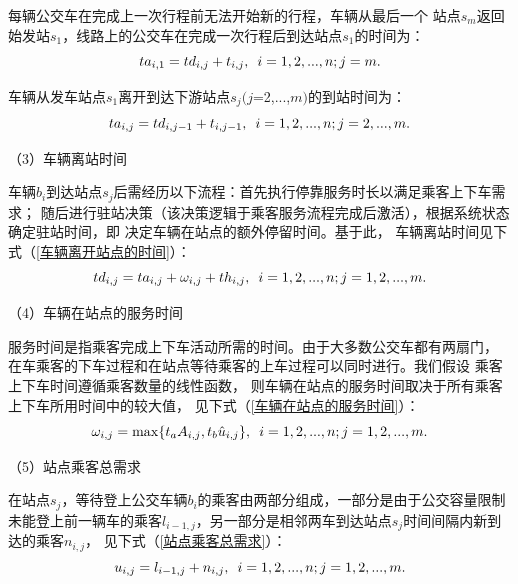 每辆公交车在完成上一次行程前无法开始新的行程，车辆从最后一个
站点$s_{m}$返回始发站$s_{1}$，线路上的公交车在完成一次行程后到达站点$s_{1}$的时间为：
\begin{equation}\label{发车时间间隔}
    ta_{i,1} = td_{i,j} + t_{i,j},\hspace{0.5em} i = 1,2,...,n; j = m.
\end{equation}

车辆从发车站点$s_{1}$离开到达下游站点$s_{j}(j$=2,...,$m)$的到站时间为：
\begin{equation}\label{车辆到达站点的时间}
    ta_{i,j} = td_{i,j-1} + t_{i,j-1},\hspace{0.5em} i = 1,2,...,n; j = 2,...,m.
\end{equation}

（3）车辆离站时间

车辆$b_{i}$到达站点$s_{j}$后需经历以下流程：首先执行停靠服务时长以满足乘客上下车需求；
随后进行驻站决策（该决策逻辑于乘客服务流程完成后激活），根据系统状态确定驻站时间，即
决定车辆在站点的额外停留时间。基于此，
车辆离站时间见下式（\ref{车辆离开站点的时间}）：
\begin{equation}\label{车辆离开站点的时间}
    td_{i,j} = ta_{i,j} + \omega_{i,j} + th_{i,j},\hspace{0.5em} i = 1,2,...,n; j = 1,2,...,m.
\end{equation}

（4）车辆在站点的服务时间

服务时间是指乘客完成上下车活动所需的时间。由于大多数公交车都有两扇门，
在车乘客的下车过程和在站点等待乘客的上车过程可以同时进行。我们假设
乘客上下车时间遵循乘客数量的线性函数，
则车辆在站点的服务时间取决于所有乘客上下车所用时间中的较大值，
见下式（\ref{车辆在站点的服务时间}）：
\begin{equation}\label{车辆在站点的服务时间}
    \omega_{i,j} = \max \{ t_{a}A_{i,j} ,t_{b}\hat{u}_{i,j}\} ,\hspace{0.5em} i = 1,2,...,n; j = 1,2,...,m.
\end{equation}

（5）站点乘客总需求

在站点$s_{j}$，等待登上公交车辆$b_{i}$的乘客由两部分组成，一部分是由于公交容量限制
未能登上前一辆车的乘客$l_{i-1,j}$，另一部分是相邻两车到达站点$s_{j}$时间间隔内新到达的乘客$n_{i,j}$，
见下式（\ref{站点乘客总需求}）：
\begin{equation}\label{站点乘客总需求}
    \\u_{i,j} = l_{i-1,j} + n_{i,j},\hspace{0.5em} i = 1,2,...,n; j = 1,2,...,m.
\end{equation}

